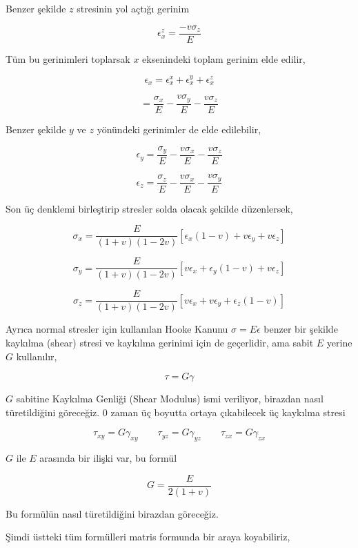 \documentclass[12pt,fleqn]{article}\usepackage{../../common}
\begin{document}
Benzer şekilde $z$ stresinin yol açtığı gerinim

$$
\epsilon_x^z =  \frac{- v \sigma_z}{E}
$$

Tüm bu gerinimleri toplarsak $x$ eksenindeki toplam gerinim elde edilir,

$$
\epsilon_x = \epsilon_x^x + \epsilon_x^y + \epsilon_x^z
$$

$$
= \frac{\sigma_x}{E} - \frac{v \sigma_y}{E} - \frac{v \sigma_z}{E} 
$$

Benzer şekilde $y$ ve $z$ yönündeki gerinimler de elde edilebilir,

$$
\epsilon_y = \frac{\sigma_y}{E} - \frac{v \sigma_x}{E} - \frac{v \sigma_z}{E} 
$$

$$
\epsilon_z = \frac{\sigma_z}{E} - \frac{v \sigma_x}{E} - \frac{v \sigma_y}{E} 
$$

Son üç denklemi birleştirip stresler solda olacak şekilde düzenlersek,

$$
\sigma_x = \frac{E}{(1+v)(1-2v)} [\epsilon_x (1-v) + v \epsilon_y + v \epsilon_z ]
$$

$$
\sigma_y = \frac{E}{(1+v)(1-2v)} [ v \epsilon_x + \epsilon_y (1-v) + v \epsilon_z  ]
$$

$$
\sigma_z = \frac{E}{(1+v)(1-2v)} [v \epsilon_x + v \epsilon_y + \epsilon_z (1-v)  ]
$$

Ayrıca normal stresler için kullanılan Hooke Kanunu $\sigma = E \epsilon$ benzer
bir şekilde kaykılma (shear) stresi ve kaykılma gerinimi için de geçerlidir, ama
sabit $E$ yerine $G$ kullanılır,

$$
\tau = G \gamma
$$

$G$ sabitine Kaykılma Genliği (Shear Modulus) ismi veriliyor, birazdan nasıl
türetildiğini göreceğiz. 0 zaman üç boyutta ortaya çıkabilecek üç kaykılma
stresi

$$
\tau_{xy} = G \gamma_{xy} \qquad 
\tau_{yz} = G \gamma_{yz} \qquad 
\tau_{zx} = G \gamma_{zx}
$$

$G$ ile $E$ arasında bir ilişki var, bu formül

$$
G = \frac{E}{2(1+v)}
$$

Bu formülün nasıl türetildiğini birazdan göreceğiz.

Şimdi üstteki tüm formülleri matris formunda bir araya koyabiliriz,
\end{document}
